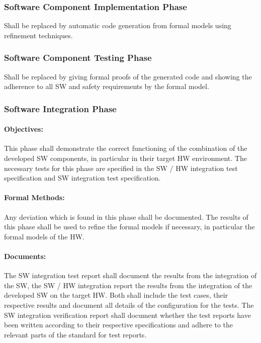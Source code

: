 \subsubsection{Software Component Implementation Phase}
\label{sec:softw-comp-impl}

Shall be replaced by automatic code generation from formal models using
refinement techniques.

\subsubsection{Software Component Testing Phase}
\label{sec:softw-comp-test}

Shall be replaced by giving formal proofs of the generated code and showing the
adherence to all SW and safety requirements by the formal model.

\subsubsection{Software Integration Phase}
\label{sec:softw-integr-phase}

\paragraph{Objectives:}
\label{sec:sw-int-objectives}
This phase shall demonstrate the correct functioning of the combination of the
developed SW components, in particular in their target HW environment. The
necessary tests for this phase are specified in the SW / HW integration test
specification and SW integration test specification.

\paragraph{Formal Methods:}
\label{sec:sw-int-formal-methods}
Any deviation which is found in this phase shall be documented. The results of
this phase shall be used to refine the formal models if necessary, in particular
the formal models of the HW.

\paragraph{Documents:}
\label{sec:sw-int-documents}
The SW integration test report shall document the results from the integration
of the SW, the SW / HW integration report the results from the integration of
the developed SW on the target HW. Both shall include the test cases, their
respective results and document all details of the configuration for the
tests. The SW integration verification report shall document whether the test
reports have been written according to their respective specifications and
adhere to the relevant parts of the standard for test reports.

